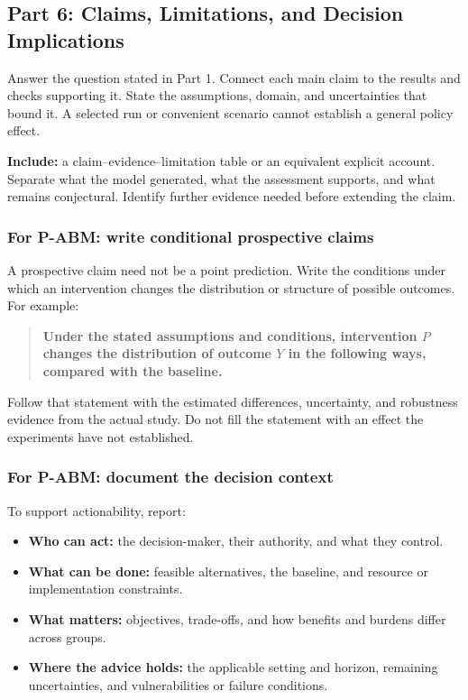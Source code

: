 \documentclass[11pt,a4paper]{article}
\begin{document}
\subsection{Part 6: Claims, Limitations, and Decision Implications}

Answer the question stated in Part 1. Connect each main claim to the results and checks supporting it. State the assumptions, domain, and uncertainties that bound it. A selected run or convenient scenario cannot establish a general policy effect.

\textbf{Include:} a claim--evidence--limitation table or an equivalent explicit account. Separate what the model generated, what the assessment supports, and what remains conjectural. Identify further evidence needed before extending the claim.

\subsubsection{For P-ABM: write conditional prospective claims}

A prospective claim need not be a point prediction. Write the conditions under which an intervention changes the distribution or structure of possible outcomes. For example:
\begin{quote}
\textbf{Under the stated assumptions and conditions, intervention $P$ changes the distribution of outcome $Y$ in the following ways, compared with the baseline.}
\end{quote}
Follow that statement with the estimated differences, uncertainty, and robustness evidence from the actual study. Do not fill the statement with an effect the experiments have not established.

\subsubsection{For P-ABM: document the decision context}

To support actionability, report:
\begin{itemize}
\item \textbf{Who can act:} the decision-maker, their authority, and what they control.
\item \textbf{What can be done:} feasible alternatives, the baseline, and resource or implementation constraints.
\item \textbf{What matters:} objectives, trade-offs, and how benefits and burdens differ across groups.
\item \textbf{Where the advice holds:} the applicable setting and horizon, remaining uncertainties, and vulnerabilities or failure conditions.
\end{itemize}
\end{document}
